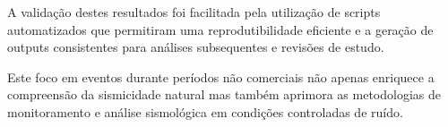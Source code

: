 \par{A validação destes resultados foi facilitada pela utilização de scripts automatizados que permitiram uma reprodutibilidade eficiente e a geração de outputs consistentes para análises subsequentes e revisões de estudo.}

\par{Este foco em eventos durante períodos não comerciais não apenas enriquece a compreensão da sismicidade natural mas também aprimora as metodologias de monitoramento e análise sismológica em condições controladas de ruído.}
